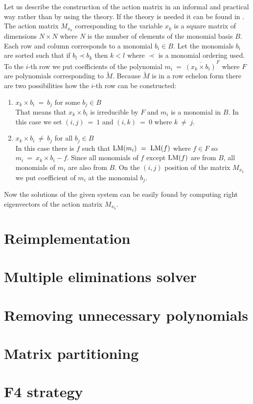 Let us describe the construction of the action matrix in an informal and practical way rather than by using the theory. If the theory is needed it can be found in \cite{KukelovaAlgMethods}. The action matrix $M_{x_k}$ corresponding to the variable $x_k$ is a square matrix of dimensions $N \times N$ where $N$ is the number of elements of the monomial basis $B$. Each row and column corresponds to a monomial $b_i \in B$. Let the monomials $b_i$ are sorted such that if $b_l \prec b_k$ then $k < l$ where $\prec$ is a monomial ordering used. To the $i$-th row we put coefficients of the polynomial $m_i\ =\ \overline{(x_k \times b_i)}^F$ where $F$ are polynomials corresponding to $\tilde{M}$. Because $\tilde{M}$ is in a row echelon form there are two possibilities how the $i$-th row can be constructed:
\begin{enumerate}
  \item $x_k \times b_i\ =\ b_j$ for some $b_j \in B$\\
        That means that $x_k \times b_i$ is irreducible by $F$ and $m_i$ is a monomial in $B$. In this case we set $(i, j)\ =\ 1$ and $(i, k)\ =\ 0$ where $k\ \neq\ j$.
  \item $x_k \times b_i\ \neq\ b_j$ for all $b_j \in B$\\
	  In this case there is $f$ such that $\operatorname{LM}(m_i)\ =\ \operatorname{LM}(f)$ where $f \in F$ so $m_i\ =\ x_k\times b_i - f$. Since all monomials of $f$ except $\operatorname{LM}(f)$ are from $B$, all monomials of $m_i$ are also from $B$. On the $(i, j)$ position of the matrix $M_{x_k}$ we put coefficient of $m_i$ at the monomial $b_j$.
\end{enumerate}

Now the solutions of the given system can be easily found by computing right eigenvectors of the action matrix $M_{x_k}$.

\section{Reimplementation}

\section{Multiple eliminations solver}

\section{Removing unnecessary polynomials}

\section{Matrix partitioning}

\section{F4 strategy}
